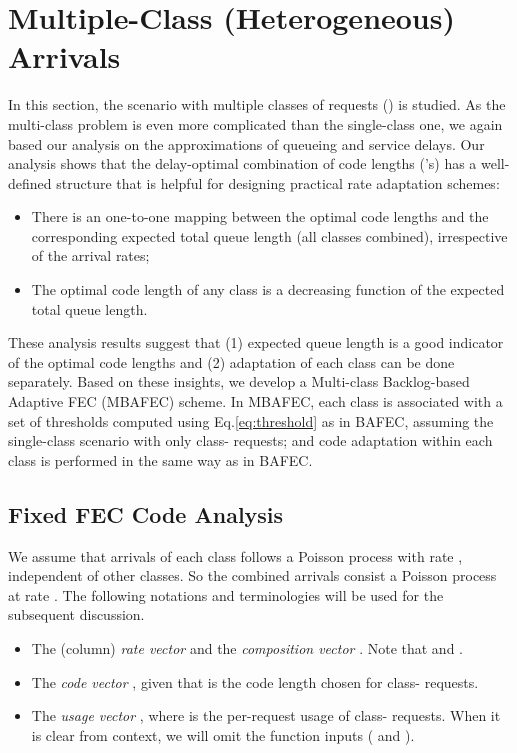 \documentclass[journal]{IEEEtran}
\newcommand{\nonBlocking}{{BAFEC}\xspace}
\newcommand{\multiclass}{{MBAFEC}\xspace}
\begin{document}
\newcommand{\smallwidth}{0.26\textwidth}

\section{Multiple-Class (Heterogeneous) Arrivals}
\label{sec:theory}
In this section, the scenario with multiple classes of requests () is studied. As the multi-class problem is even more complicated than the single-class one, we again based our analysis on the approximations of queueing and service delays. Our analysis shows that the delay-optimal combination of code lengths ('s) has a well-defined structure that is helpful for designing practical rate adaptation schemes:
\begin{itemize}
\item There is an one-to-one mapping between the optimal code lengths and the corresponding expected total queue length (all classes combined), irrespective of the arrival rates;
\item The optimal code length of any class is a decreasing function of the expected total queue length. 
\end{itemize}
These analysis results suggest that (1) expected queue length is a good indicator of the optimal code lengths and (2) adaptation of each class can be done separately.
Based on these insights, we
develop a Multi-class Backlog-based Adaptive FEC (\multiclass) scheme. In \multiclass, each class  is associated with a set of thresholds computed using Eq.\ref{eq:threshold} as in \nonBlocking, assuming  the single-class scenario with only class- requests;  and code adaptation within each class is performed in the same way as in \nonBlocking. 

\subsection{Fixed FEC Code Analysis}
\label{ssec:multi:fixed}
We assume that arrivals of each class  follows a Poisson process with rate , independent of other classes. So the combined arrivals consist a Poisson process at rate . The following notations and terminologies will be used for the subsequent discussion.

\begin{itemize}
\item The (column) {\em rate vector}  and the {\em composition vector} . Note that  and . 

\item 
The {\em code vector} , given that  is the code length chosen for class- requests.


\item 
The {\em usage vector} , where  is the per-request usage of class- requests. When it is clear from context, we will omit the function inputs ( and ). 
\end{itemize}
\end{document}
